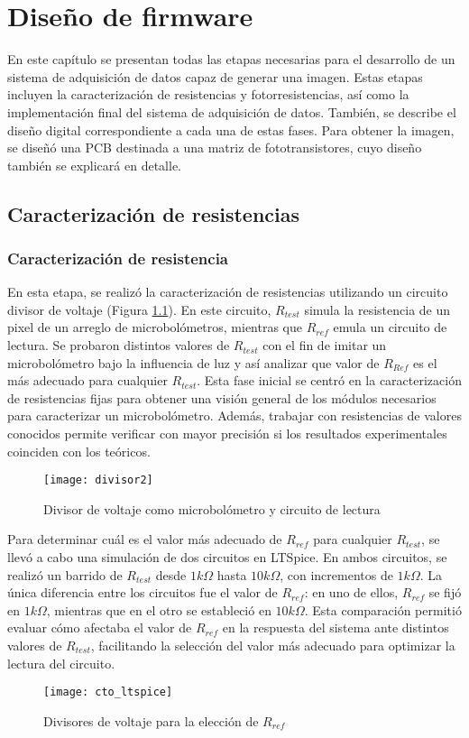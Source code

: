 \chapter{Diseño de firmware}
En este capítulo se presentan todas las etapas necesarias para el desarrollo de un sistema de adquisición de datos capaz de generar una imagen. Estas etapas incluyen la caracterización de resistencias y fotorresistencias, así como la implementación final del sistema de adquisición de datos. También, se describe el diseño digital correspondiente a cada una de estas fases. Para obtener la imagen, se diseñó una PCB destinada a una matriz de fototransistores, cuyo diseño también se explicará en detalle.

\section{Caracterización de resistencias}
\subsection{Caracterización de resistencia}
En esta etapa, se realizó la caracterización de resistencias utilizando un circuito divisor de voltaje (Figura \ref{fig:divisor2}). En este circuito, $R_{test}$ simula la resistencia de un pixel de un arreglo de microbolómetros, mientras que $R_{ref}$ emula un circuito de lectura. Se probaron distintos valores de $R_{test}$ con el fin de imitar un microbolómetro bajo la influencia de luz y así analizar que valor de $R_{Ref}$ es el más adecuado para cualquier $R_{test}$. Esta fase inicial se centró en la caracterización de resistencias fijas para obtener una visión general de los módulos necesarios para caracterizar un microbolómetro. Además, trabajar con resistencias de valores conocidos permite verificar con mayor precisión si los resultados experimentales coinciden con los teóricos.

            \begin{figure}[hbtp]
                \centering
                \texttt{[image: divisor2]}
                \caption{Divisor de voltaje como microbolómetro y circuito de lectura}
                \label{fig:divisor2}
            \end{figure} 
\newpage
Para determinar cuál es el valor más adecuado de $R_{ref}$ para cualquier $R_{test}$, se llevó a cabo una simulación de dos circuitos en LTSpice. En ambos circuitos, se realizó un barrido de $R_{test}$ desde $1k\Omega$ hasta $10k\Omega$, con incrementos de $1k\Omega$. La única diferencia entre los circuitos fue el valor de $R_{ref}$: en uno de ellos, $R_{ref}$ se fijó en $1k\Omega$, mientras que en el otro se estableció en $10k\Omega$. Esta comparación permitió evaluar cómo afectaba el valor de $R_{ref}$ en la respuesta del sistema ante distintos valores de $R_{test}$, facilitando la selección del valor más adecuado para optimizar la lectura del circuito.
            \begin{figure}[hbtp]
                \centering
                \texttt{[image: cto\_ltspice]}
                \caption{Divisores de voltaje para la elección de $R_{ref}$}
                \label{fig:cto_ltspice}
            \end{figure}

